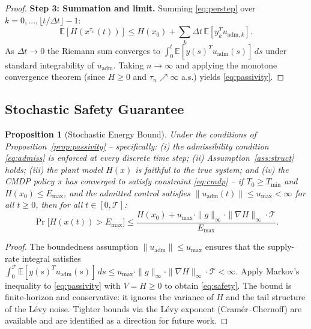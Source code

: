 \documentclass[11pt]{article}
\newtheorem{proposition}{Proposition}
\begin{document}
\begin{proof}
\textbf{Step 3: Summation and limit.} Summing \eqref{eq:perstep} over $k=0,\ldots,\lfloor t/\Delta t\rfloor-1$:
\[
\mathbb{E}[H(x^{\tau_n}(t))]\le H(x_0)+\sum_k \Delta t\,\mathbb{E}[y_k^T u_{\mathrm{adm},k}].
\]
As $\Delta t\to 0$ the Riemann sum converges to
$\int_0^t\mathbb{E}[y(s)^T u_{\mathrm{adm}}(s)]\,ds$ under standard integrability of
$u_{\mathrm{adm}}$. Taking $n\to\infty$ and applying the monotone convergence theorem
(since $H\ge 0$ and $\tau_n\nearrow\infty$ a.s.) yields \eqref{eq:passivity}.
\end{proof}

\subsection{Stochastic Safety Guarantee}

\begin{proposition}[Stochastic Energy Bound]
\label{prop:safety}
Under the conditions of Proposition~\ref{prop:passivity} -- specifically: (i) the admissibility
condition \eqref{eq:admiss} is enforced at every discrete time step; (ii) Assumption~\ref{ass:struct}
holds; (iii) the plant model $H(x)$ is faithful to the true system; and (iv) the CMDP policy
$\pi$ has converged to satisfy constraint \eqref{eq:cmdp} -- if $T_0\ge T_{\min}$ and
$H(x_0)\le E_{\max}$, and the admitted control satisfies
$\|u_{\mathrm{adm}}(t)\|\le u_{\max}<\infty$ for all $t\ge 0$, then for all $t\in[0,\mathcal{T}]$:
\begin{equation}
\Pr\bigl[H(x(t))>E_{\max}\bigr]
\le \frac{H(x_0)+u_{\max}\cdot\|g\|_\infty\cdot\|\nabla H\|_\infty\cdot\mathcal{T}}{E_{\max}}.
\label{eq:safety}
\end{equation}
\end{proposition}

\begin{proof}
The boundedness assumption $\|u_{\mathrm{adm}}\|\le u_{\max}$ ensures that the supply-rate
integral satisfies $\int_0^\mathcal{T}\mathbb{E}[y(s)^T u_{\mathrm{adm}}(s)]\,ds
\le u_{\max}\cdot\|g\|_\infty\cdot\|\nabla H\|_\infty\cdot\mathcal{T}<\infty$. Apply
Markov's inequality \cite{billingsley1995} to \eqref{eq:passivity} with $V=H\ge 0$ to obtain
\eqref{eq:safety}. The bound is finite-horizon and conservative: it ignores the variance of
$H$ and the tail structure of the L\'{e}vy noise. Tighter bounds via the L\'{e}vy exponent
(Cram\'{e}r--Chernoff) are available \cite{applebaum2009} and are identified as a direction
for future work.
\end{proof}
\end{document}
